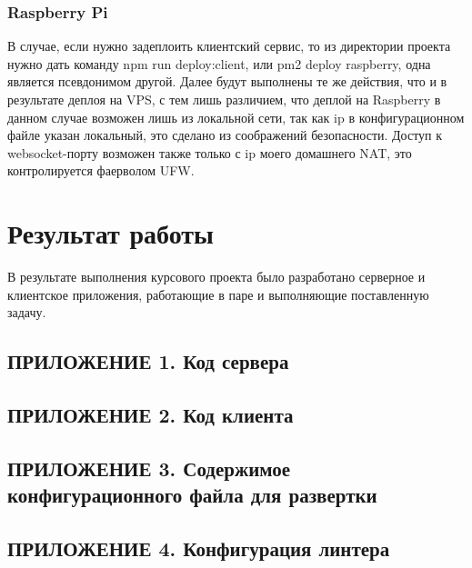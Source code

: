 \documentclass[a4paper, 12pt]{article}
\begin{document}
    \subsubsection*{Raspberry Pi}
    В случае, если нужно задеплоить клиентский сервис, то из директории проекта нужно дать команду npm run deploy:client, или
    pm2 deploy raspberry, одна является псевдонимом другой. Далее будут выполнены те же действия, что и в результате
    деплоя на VPS, с тем лишь различием, что деплой на Raspberry в данном случае возможен лишь из локальной сети, так
    как ip в конфигурационном файле указан локальный, это сделано из соображений безопасности. Доступ к websocket-порту
    возможен также только с ip моего домашнего NAT, это контролируется фаерволом UFW.

    \section*{Результат работы}
    В результате выполнения курсового проекта было разработано серверное и клиентское приложения,
    работающие в паре и выполняющие поставленную задачу.

    \newpage
    \subsection*{ПРИЛОЖЕНИЕ 1. Код сервера}
    

    \newpage
    \subsection*{ПРИЛОЖЕНИЕ 2. Код клиента}
    

    \newpage
    \subsection*{ПРИЛОЖЕНИЕ 3. Содержимое конфигурационного файла для развертки}
    

    \newpage
    \subsection*{ПРИЛОЖЕНИЕ 4. Конфигурация линтера}
    
\end{document}
